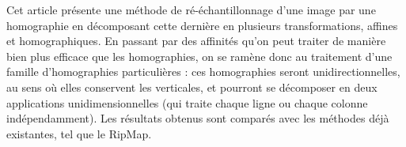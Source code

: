 
Cet article présente une méthode de ré-échantillonnage d'une image par une homographie en décomposant cette dernière en plusieurs transformations, affines et homographiques. En passant par des affinités qu'on peut traiter de manière bien plus efficace que les homographies, on se ramène donc au traitement d'une famille d'homographies particulières : ces homographies seront unidirectionnelles, au sens où elles conservent les verticales, et pourront se décomposer en deux applications unidimensionnelles (qui traite chaque ligne ou chaque colonne indépendamment). Les résultats obtenus sont comparés avec les méthodes déjà existantes, tel que le RipMap.

